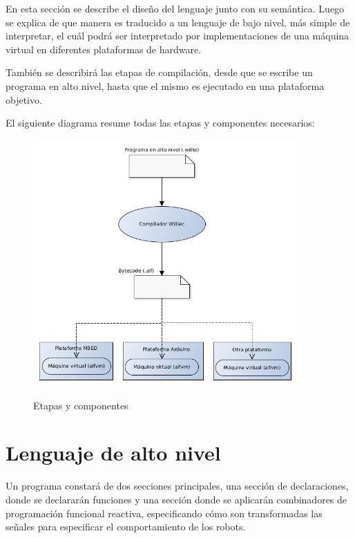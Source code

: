 En esta sección se describe el diseño del lenguaje junto con su semántica.
Luego se explica de que manera es traducido a un lenguaje de bajo nivel, más
simple de interpretar, el cuál podrá ser interpretado por implementaciones de
una máquina virtual en diferentes plataformas de hardware.

También se describirá las etapas de compilación, desde que se escribe
un programa en alto nivel, hasta que el mismo es ejecutado en una
plataforma objetivo.

El siguiente diagrama resume todas las etapas y componentes necesarios:

\begin{figure}[h]
\begin{center}
\caption{Etapas y componentes}
\includegraphics[width=0.9\textwidth]{graphs/compilacion.png}
\label{fig:compilacion}
\end{center}
\end{figure}

\newpage

\section{Lenguaje de alto nivel}

  Un programa constará de dos secciones principales, una sección de declaraciones, donde
se declararán funciones y una sección donde se aplicarán combinadores de programación
funcional reactiva, especificando cómo son transformadas las señales para especificar
el comportamiento de los robots.


